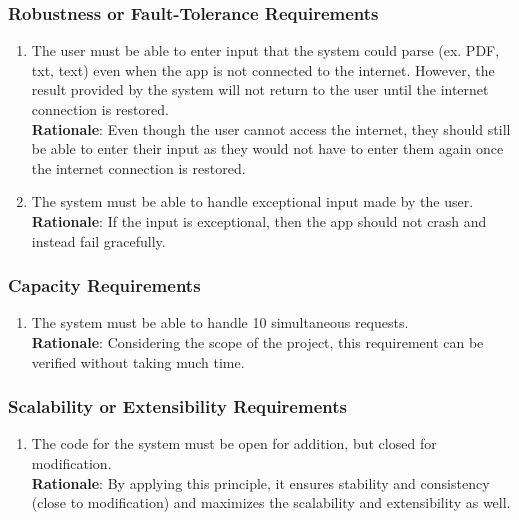 \subsubsection{Robustness or Fault-Tolerance Requirements}
\label{ssub:robustness_or_fault_tolerance_requirements}
\begin{enumerate}[{PR-RFT}1. ]
	\item The user must be able to enter input that the system could parse (ex. PDF, txt, text) even when the app is not connected to the internet. However, the result provided by the system will not return to the user until the internet connection is restored.
	\\ \textbf{Rationale}: Even though the user cannot access the internet, they should still be able to enter their input as they would not have to enter them again once the internet connection is restored.
	\item The system must be able to handle exceptional input made by the user.
	\\ \textbf{Rationale}: If the input is exceptional, then the app should not crash and instead fail gracefully.
\end{enumerate}

\subsubsection{Capacity Requirements}
\label{ssub:capacity_requirements}
\begin{enumerate}[{PR-C}1. ]
	\item The system must be able to handle 10 simultaneous requests.
	\\ \textbf{Rationale}: Considering the scope of the project, this requirement can be verified without taking much time.	
\end{enumerate}

\subsubsection{Scalability or Extensibility Requirements}
\label{ssub:scalability_or_extensibility_requirements}
\begin{enumerate}[{PR-SE}1. ]
	\item The code for the system must be open for addition, but closed for modification.
	\\ \textbf{Rationale}: By applying this principle, it ensures stability and consistency (close to modification) and maximizes the scalability and extensibility as well.
\end{enumerate}

